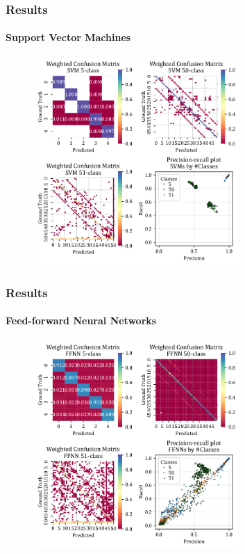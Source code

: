 \documentclass[xcolor={svgnames,table},10pt,fleqn]{beamer}
\begin{document}
\begin{frame}
    \frametitle{Results}
    \framesubtitle{Support Vector Machines}
    \begin{figure}[h]
        \centering
        \includegraphics[width=0.7\textwidth]{imgs/05_mean_conf_mat_svm.pdf}
    \end{figure}
\end{frame}

\begin{frame}
    \frametitle{Results}
    \framesubtitle{Feed-forward Neural Networks}
    \begin{figure}[h]
        \centering
        \includegraphics[width=0.7\textwidth]{imgs/05_mean_conf_mat_ffnn.pdf}
    \end{figure}
\end{frame}
\end{document}

